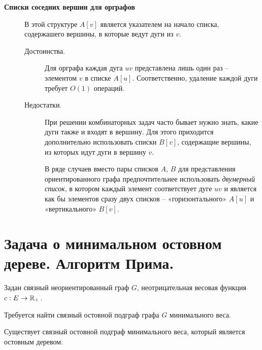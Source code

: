 \begin{note}
\begin{description}
        \item[ \textbf{Списки соседних вершин для орграфов}]
              В этой структуре $ A[v] $ является указателем на начало списка, содержашего вершины, в которые ведут дуги из $ v $.
              \begin{description}
                  \item[Достоинства.] Для орграфа каждая дуга $ uv $ представлена лишь один раз – элементом $ v $ в списке $ A[u] $. Соответственно, удаление каждой дуги требует $ O(1) $ операций.
                  \item[Недостатки.]
                        При решении комбинаторных задач часто бывает нужно знать, какие дуги также и входят в вершину. Для этого приходится дополнительно использовать списки $ B[v] $, содержащие вершины, из которых идут дуги в вершину $ v $.

                        В ряде случаев вместо пары списков $ A $, $ B $ для представления ориентированного графа предпочтительнее использовать \emph{двумерный список}, в котором каждый элемент соответствует дуге $ uv $ и является как бы элементов сразу двух списков – «горизонтального» $ A[u] $ и «вертикального» $ B[v] $.
              \end{description}
    \end{description}
\end{note}

\section{Задача о минимальном остовном дереве. Алгоритм Прима.}

\begin{note}[ТГ постановка]
    Задан связный неориентированный граф $ G $, неотрицательная весовая функция $ c: E \rightarrow \mathbb{R}_+ $.

    Требуется найти связный остовной подграф графа $ G $ минимального веса.
\end{note}

\begin{remark}
    Существует связный остовной подграф минимального веса, который является остовным деревом.
\end{remark}

